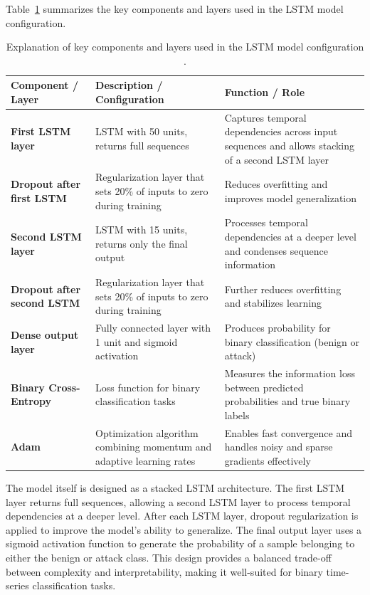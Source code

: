Table~\ref{tab:lstm_components} summarizes the key components and layers used in the LSTM model configuration. 
\begin{table}[H]
\centering
\begin{tabular}{|l|p{5cm}|p{6cm}|}
\hline
\textbf{Component / Layer} & \textbf{Description / Configuration} & \textbf{Function / Role} \\
\hline
\textbf{First LSTM layer} & LSTM with 50 units, returns full sequences  & Captures temporal dependencies across input sequences and allows stacking of a second LSTM layer  \\
\hline
\textbf{Dropout after first LSTM} & Regularization layer that sets 20\% of inputs to zero during training  & Reduces overfitting and improves model generalization  \\
\hline
\textbf{Second LSTM layer} & LSTM with 15 units, returns only the final output  & Processes temporal dependencies at a deeper level and condenses sequence information  \\
\hline
\textbf{Dropout after second LSTM} & Regularization layer that sets 20\% of inputs to zero during training  & Further reduces overfitting and stabilizes learning  \\
\hline
\textbf{Dense output layer} & Fully connected layer with 1 unit and sigmoid activation  & Produces probability for binary classification (benign or attack)  \\
\hline
\textbf{Binary Cross-Entropy} & Loss function for binary classification tasks  & Measures the information loss between predicted probabilities and true binary labels  \\
\hline
\textbf{Adam} & Optimization algorithm combining momentum and adaptive learning rates  & Enables fast convergence and handles noisy and sparse gradients effectively  \\
\hline
\end{tabular}
\caption{Explanation of key components and layers used in the LSTM model configuration \cite{dropout}\cite{sigmoid}\cite{loss_function}\cite{adam}.}
\label{tab:lstm_components}
\end{table}

The model itself is designed as a stacked LSTM architecture. The first LSTM layer returns full sequences, allowing a second LSTM layer to process temporal dependencies at a deeper level. After each LSTM layer, dropout regularization is applied to improve the model’s ability to generalize. The final output layer uses a sigmoid activation function to generate the probability of a sample belonging to either the benign or attack class. This design provides a balanced trade-off between complexity and interpretability, making it well-suited for binary time-series classification tasks.\\

